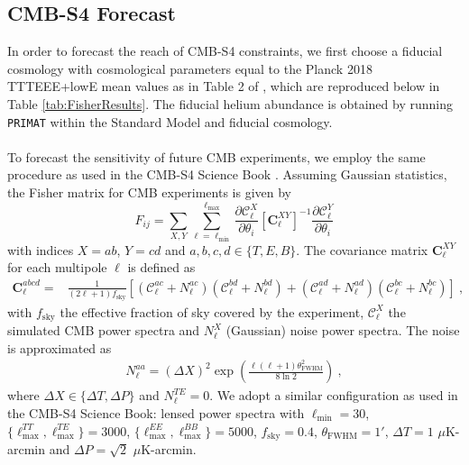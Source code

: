 \subsection{CMB-S4 Forecast}
\label{app:CMBfisher}
In order to forecast the reach of CMB-S4 constraints, we first choose a fiducial cosmology with cosmological parameters equal to the Planck 2018 TTTEEE+lowE mean values as in Table 2 of \cite{Aghanim:2018eyx}, which are reproduced below in Table \ref{tab:FisherResults}.
The fiducial helium abundance is obtained by running \texttt{PRIMAT} within the Standard Model and fiducial cosmology.\\\\
\noindent To forecast the sensitivity of future CMB experiments, we employ the same procedure as used in the CMB-S4 Science Book \cite{Abazajian:2016yjj}. Assuming Gaussian statistics, the Fisher matrix for CMB experiments is given by
\begin{equation}
F_{i j}=\sum_{X, Y} \sum_{\ell=\ell_{\min }}^{\ell_{\max }} \frac{\partial \mathcal{C}_{\ell}^{X}}{\partial \theta_{i}}\left[\mathbf{C}_{\ell}^{X Y}\right]^{-1} \frac{\partial \mathcal{C}_{\ell}^{Y}}{\partial \theta_{i}}
\end{equation}
with indices $X = ab$, $Y = cd$ and $a,b,c,d\in\{T,E,B\}$. 
The covariance matrix $\mathbf{C}_\ell^{XY}$ for each multipole $\ell$ is defined as
\begin{align}
    \mathbf{C}_\ell^{abcd} =& \frac{1}{(2\ell+1)f_{\mathrm{sky}}}\left[\left(\mathcal{C}_\ell^{ac}+N_\ell^{ac}\right)\left(\mathcal{C}_\ell^{bd}+N_\ell^{bd}\right)
    + \left(\mathcal{C}_\ell^{ad}+N_\ell^{ad}\right)\left(\mathcal{C}_\ell^{bc}+N_\ell^{bc}\right)\right]\ ,
\end{align}
with $f_{\mathrm{sky}}$ the effective fraction of sky covered by the experiment, $\mathcal{C}_\ell^X$ the simulated CMB power spectra and $N_\ell^X$ (Gaussian) noise power spectra. The noise is approximated as
\begin{align}
    N_\ell^{aa} = (\Delta X)^2\exp\left(\frac{\ell(\ell+1)\theta^2_{\mathrm{FWHM}}}{8\ln2}\right)\ ,
\end{align}
where $\Delta X \in \{\Delta T,\Delta P\}$ and $N_\ell^{TE} = 0$.
We adopt a similar configuration as used in the CMB-S4 Science Book: lensed power spectra with $\ell_{\mathrm{min}} = 30$, $\{\ell_{\mathrm{max}}^{TT}, \ell_{\mathrm{max}}^{TE}\} = 3000$, $\{\ell_{\mathrm{max}}^{EE},\ell_{\mathrm{max}}^{BB}\} = 5000$, $f_{\mathrm{sky}} = 0.4$, $\theta_{\mathrm{FWHM}} = 1'$, $\Delta T = 1$ $\mu$K-arcmin and $\Delta P = \sqrt{2}$ $\mu$K-arcmin.\\\\
